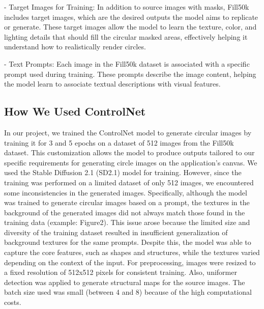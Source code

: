 \documentclass[12pt,a4paper]{report}
\begin{document}
- Target Images for Training: In addition to source images with masks, Fill50k includes target images, which are the desired outputs the model aims to replicate or generate. These target images allow the model to learn the texture, color, and lighting details that should fill the circular masked areas, effectively helping it understand how to realistically render circles.

- Text Prompts: Each image in the Fill50k dataset is associated with a specific prompt used during training. These prompts describe the image content, helping the model learn to associate textual descriptions with visual features.

\subsection*{How We Used ControlNet}
In our project, we trained the ControlNet model to generate circular images by training it for 3 and 5 epochs on a dataset of 512 images from the Fill50k dataset. This customization allows the model to produce outputs tailored to our specific requirements for generating circle images on the application’s canvas.
We used the Stable Diffusion 2.1 (SD2.1) model for training. However, since the training was performed on a limited dataset of only 512 images, we encountered some inconsistencies in the generated images. Specifically, although the model was trained to generate circular images based on a prompt, the textures in the background of the generated images did not always match those found in the training data (example: Figure2). This issue arose because the limited size and diversity of the training dataset resulted in insufficient generalization of background textures for the same prompts. Despite this, the model was able to capture the core features, such as shapes and structures, while the textures varied depending on the context of the input.
For preprocessing, images were resized to a fixed resolution of 512x512 pixels for consistent training. Also, uniformer detection was applied to generate structural maps for the source images.  The batch size used was small (between 4 and 8) because of the high computational costs. 
\end{document}
